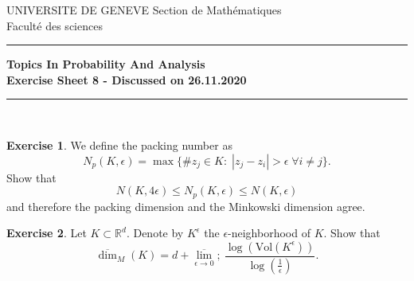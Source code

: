\documentclass[a4paper,11pt]{article}
\theoremstyle{definition}
\newtheorem{exercise}{Exercise}
\begin{document}
\pagestyle{headings}
\noindent UNIVERSITE DE GENEVE \hfill Section de Mathématiques\\
\noindent Facult\'e des sciences \hfill \\[-3mm]
\hrule

\large

\begin{center}
\textbf{Topics In Probability And Analysis \\ Exercise Sheet 8 - Discussed on 26.11.2020}
\end{center}
\hrule
\text{}\\[1cm]

\begin{exercise}
    We define the packing number as 
    \[N_p(K, \epsilon) = \max\{\# z_j \in K : \; |z_j - z_i| > \epsilon \; \forall i \neq  j\}.\]
    Show that
    \[N(K, 4\epsilon) \leq N_p(K, \epsilon) \leq N(K,\epsilon)\]
    and therefore the packing dimension and the Minkowski dimension agree.
\end{exercise}

\begin{exercise}
    Let $K\subset \mathbb{R}^d$. Denote by $K^\epsilon$ the $\epsilon$-neighborhood of $K$. Show that
    \[\overline{\dim}_M(K) = d + \overline{\lim_{\epsilon \to 0}} ;\ \frac{\log(\text{Vol}(K^\epsilon))}{\log(\frac{1}{\epsilon} )}.\]
\end{exercise}
\end{document}
